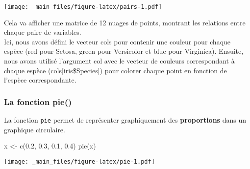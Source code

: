 \documentclass[
]{article}
\newenvironment{Shaded}{\begin{snugshade}}{\end{snugshade}}
\newcommand{\AttributeTok}[1]{\textcolor[rgb]{0.77,0.63,0.00}{#1}}
\newcommand{\CommentTok}[1]{\textcolor[rgb]{0.56,0.35,0.01}{\textit{#1}}}
\newcommand{\DecValTok}[1]{\textcolor[rgb]{0.00,0.00,0.81}{#1}}
\newcommand{\FloatTok}[1]{\textcolor[rgb]{0.00,0.00,0.81}{#1}}
\newcommand{\FunctionTok}[1]{\textcolor[rgb]{0.00,0.00,0.00}{#1}}
\newcommand{\NormalTok}[1]{#1}
\newcommand{\OtherTok}[1]{\textcolor[rgb]{0.56,0.35,0.01}{#1}}
\newcommand{\SpecialCharTok}[1]{\textcolor[rgb]{0.00,0.00,0.00}{#1}}
\newcommand{\StringTok}[1]{\textcolor[rgb]{0.31,0.60,0.02}{#1}}
\begin{document}
\begin{Shaded}
\end{Shaded}

\texttt{[image: \_main\_files/figure-latex/pairs-1.pdf]}

Cela va afficher une matrice de 12 nuages de points, montrant les relations entre chaque paire de variables.\\
Ici, nous avons défini le vecteur cols pour contenir une couleur pour chaque espèce (red pour Setosa, green pour Versicolor et blue pour Virginica). Ensuite, nous avons utilisé l'argument col avec le vecteur de couleurs correspondant à chaque espèce (cols{[}iris\$Species{]}) pour colorer chaque point en fonction de l'espèce correspondante.

\hypertarget{la-fonction-pie}{%
\subsubsection{La fonction pie()}\label{la-fonction-pie}}

La fonction \texttt{pie} permet de représenter graphiquement des \textbf{proportions} dans un graphique circulaire.

\begin{Shaded}
\begin{Highlighting}[]
\NormalTok{x }\OtherTok{\textless{}{-}} \FunctionTok{c}\NormalTok{(}\FloatTok{0.2}\NormalTok{, }\FloatTok{0.3}\NormalTok{, }\FloatTok{0.1}\NormalTok{, }\FloatTok{0.4}\NormalTok{)}
\FunctionTok{pie}\NormalTok{(x)}
\end{Highlighting}
\end{Shaded}

\texttt{[image: \_main\_files/figure-latex/pie-1.pdf]}
\end{document}
